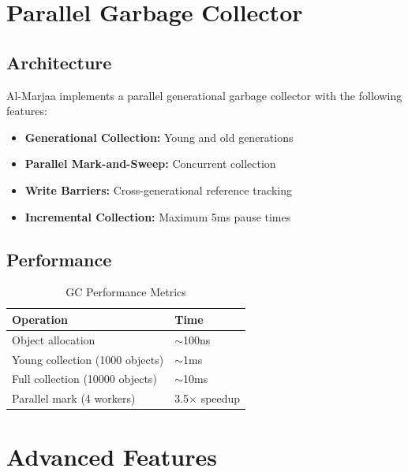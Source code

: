 \documentclass[11pt,a4paper]{article}
\begin{document}
\section{Parallel Garbage Collector}
\label{sec:gc}

\subsection{Architecture}

Al-Marjaa implements a parallel generational garbage collector with the following features:

\begin{itemize}
    \item \textbf{Generational Collection:} Young and old generations
    \item \textbf{Parallel Mark-and-Sweep:} Concurrent collection
    \item \textbf{Write Barriers:} Cross-generational reference tracking
    \item \textbf{Incremental Collection:} Maximum 5ms pause times
\end{itemize}

\subsection{Performance}

\begin{table}[h]
\centering
\caption{GC Performance Metrics}
\label{tab:gc-perf}
\begin{tabular}{@{}ll@{}}
\toprule
\textbf{Operation} & \textbf{Time} \\
\midrule
Object allocation & $\sim$100ns \\
Young collection (1000 objects) & $\sim$1ms \\
Full collection (10000 objects) & $\sim$10ms \\
Parallel mark (4 workers) & 3.5$\times$ speedup \\
\bottomrule
\end{tabular}
\end{table}

\section{Advanced Features}
\label{sec:advanced}
\end{document}
